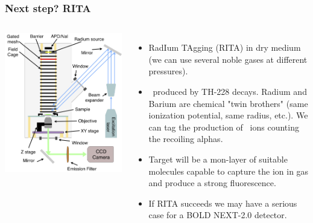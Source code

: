 \begin{frame}
\frametitle{Next step? RITA}

\begin{columns}
 
\includegraphics[scale=0.35]{moriond/rita.png}
 

%   
 
\begin{itemize} 
\item RadIum TAgging (RITA) in dry medium (we can use several noble gases at different pressures).   
\item \Rapp\ produced by TH-228 decays. Radium and Barium are chemical "twin brothers" (same ionization potential, same radius, etc.). We can tag the production of \Rapp\ ions counting the recoiling alphas. 
\item Target will be a mon-layer of suitable molecules capable to capture the ion in gas and produce a strong fluorescence.
\item If RITA succeeds we may have a serious case for a BOLD NEXT-2.0 detector. 
\end{itemize}
\end{columns}
\end{frame}






